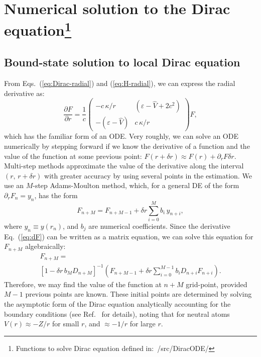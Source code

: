 \documentclass[10pt,twocolumn,a4paper]{article}%
\newcommand{\matr}[4]{\ensuremath{\begin{pmatrix}#1&#2\\#3&#4\end{pmatrix}}}	%
\newcommand{\be}{\begin{equation}}
\newcommand{\ee}{\end{equation}}
\def\en{\ensuremath{\varepsilon}}
\def\p{\ensuremath{\partial}}
\renewcommand{\k}{\ensuremath{\kappa}}
\begin{document}


\section[Numerical solution to the Dirac equation]{Numerical solution to the Dirac equation\footnote{Functions to solve Dirac equation defined in:~/src/DiracODE/}}

\subsection{Bound-state solution to local Dirac equation}\label{sec:solveDirac}

From Eqs.~(\ref{eq:Dirac-radial}) and (\ref{eq:H-radial}), we can express the radial derivative as:
\be\label{eq:dF}
\frac{\p F}{\p r}
=\frac{1}{c} \matr 	{-c\,{\k}/{r}} 	{(\en - \hat V+2c^2)}  {-(\en - \hat V)} 	 {c\,{\k}/{r}}F,
\ee
which has the familiar form of an ODE.
Very roughly, we can solve an ODE numerically by stepping forward if we know the derivative of a function and the value of the function at some previous point: $F(r+\delta r) \approx F(r) + {\p_r F}\delta r$.
Multi-step methods approximate the value of the derivative along the interval $(r, \, r+\delta r)$ with greater accuracy by using several points in the estimation. 
We use an $M$-step Adams-Moulton method,
which, for a general DE of the form $\p_r F_n  = y_n$, has the form
\be\label{eq:Adams}
F_{n+M} = F_{n+M-1} + \delta r \sum_{i=0}^M b_i \, y_{n+i},
\ee
where $y_n\equiv y(r_n)$, and $b_j$ are numerical coefficients. 
Since the derivative Eq.~(\ref{eq:dF}) can be written as a matrix equation, we can solve this equation for $F_{n+M}$ algebraically:
\begin{multline}
F_{n+M} = \\\left[1 - \delta r\,b_M D_{n+M}\right]^{-1}\left(F_{n+M-1} + \delta r \sum_{i=0}^{M-1} b_i D_{n+i}F_{n+i}\right).
\end{multline}
Therefore, we may find the value of the function at ${n+M}$ grid-point, provided $M-1$ previous points are known.
These initial points are determined by solving the asymptotic form of the Dirac equation analytically accounting for the boundary conditions (see Ref.~\cite{JohnsonBook2007} for details), noting that for neutral atoms $V(r)\approx-Z/r$ for small $r$, and 
$\approx-1/r$ for large $r$. 
\end{document}
